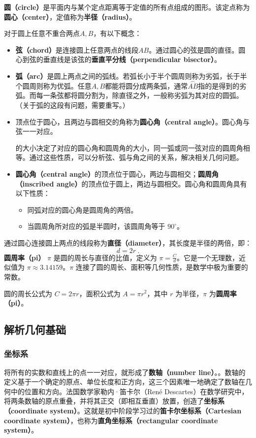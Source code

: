 \textbf{圆（circle）}是平面内与某个定点距离等于定值的所有点组成的图形。该定点称为\textbf{圆心（center）}，定值称为\textbf{半径（radius）}。

对于圆上任意不重合两点$A,B$，有以下概念：
\begin{itemize}
\item \textbf{弦（chord）}是连接圆上任意两点的线段$AB$。通过圆心的弦是圆的直径。圆心到弦的垂直线是该弦的\textbf{垂直平分线（perpendicular bisector）}。
\item \textbf{弧（arc）}是圆上两点之间的弧线。若弧长小于半个圆周则称为劣弧，长于半个圆周则称为优弧。任意$A,B$都能将圆分成两条弧，通常$\overset{\frown} {AB}$指的是得到的劣弧。而每一条弦都将圆分割为，除直径之外，一般称劣弧为其对应的圆弧。（关于弧的这段有问题，需要重写。）
\item 顶点位于圆心，且两边与圆相交的角称为\textbf{圆心角（central angle）}。圆心角与弦一一对应。

的大小决定了对应的圆心角和圆周角的大小，同一弧或同一弦对应的圆周角相等。通过这些性质，可以分析弦、弧与角之间的关系，解决相关几何问题。


\item \textbf{圆心角（central angle）}的顶点位于圆心，两边与圆相交；\textbf{圆周角（inscribed angle）}的顶点位于圆上，两边与圆相交。圆心角和圆周角具有以下性质：
    \begin{itemize}
        \item 同弧对应的圆心角是圆周角的两倍。
        \item 当圆周角所对应的弧是半圆时，该圆周角等于 $90^\circ$。
    \end{itemize}
\end{itemize}
通过圆心连接圆上两点的线段称为\textbf{直径（diameter）}，其长度是半径的两倍，即：
\begin{equation}
d = 2r~.
\end{equation}
\textbf{圆周率（pi）} $\pi$ 是圆的周长与直径的比值，定义为 $\pi = \frac{C}{d}$。它是一个无理数，近似值为 $\pi \approx 3.14159$。$\pi$ 连接了圆的周长、面积等几何性质，是数学中极为重要的常数。

圆的周长公式为 $C = 2\pi r$，面积公式为 $A = \pi r^2$，其中 $r$ 为半径，$\pi$ 为\textbf{圆周率（pi）}。

\subsection{解析几何基础}

\subsubsection{坐标系}
将所有的实数和直线上的点一一对应，就形成了\textbf{数轴（number line）}。。数轴的定义基于一个确定的原点、单位长度和正方向，这三个因素唯一地确定了数轴在几何中的位置和方向。法国数学家勒内·笛卡尔（René Descartes）在数学研究中，将两条数轴的原点重叠，并将其正交（即相互垂直）放置，创造了\textbf{坐标系（coordinate system）}。这就是初中阶段学习过的\textbf{笛卡尔坐标系（Cartesian coordinate system）}，也称为\textbf{直角坐标系（rectangular coordinate system）}。

